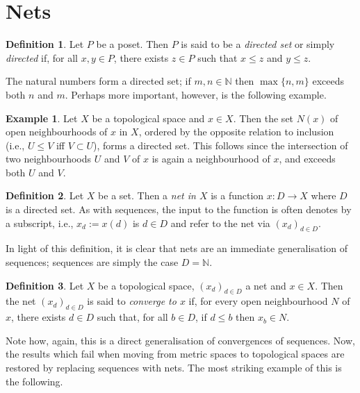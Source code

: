 \documentclass{book}
\theoremstyle{definition}
\newtheorem{definition}{Definition}[section]
\newtheorem{example}{Example}[section]
\theoremstyle{remark}
\newcommand{\N}{\mathbb{N}}
\begin{document}
\section{Nets}
\begin{definition}
Let $P$ be a poset. Then $P$ is said to be a \textit{directed set} or simply \textit{directed} if, for all $x,y\in P$, there exists $z\in P$ such that $x\leq z$ and $y\leq z$.
\end{definition}

The natural numbers form a directed set; if $m,n\in\N$ then $\max\{n,m\}$ exceeds both $n$ and $m$. Perhaps more important, however, is the following example.

\begin{example}
Let $X$ be a topological space and $x\in X$. Then the set $N(x)$ of open neighbourhoods of $x$ in $X$, ordered by the opposite relation to inclusion (i.e., $U\leq V$ iff $V\subset U$), forms a directed set. This follows since the intersection of two neighbourhoods $U$ and $V$ of $x$ is again a neighbourhood of $x$, and exceeds both $U$ and $V$.
\end{example}

\begin{definition}
Let $X$ be a set. Then a \textit{net in $X$} is a function $x:D\to X$ where $D$ is a directed set. As with sequences, the input to the function is often denotes by a subscript, i.e., $x_{d}:=x(d)$ is $d\in D$ and refer to the net via $(x_d)_{d\in D}$.
\end{definition}

In light of this definition, it is clear that nets are an immediate generalisation of sequences; sequences are simply the case $D=\N$.

\begin{definition}
Let $X$ be a topological space, $(x_d)_{d\in D}$ a net and $x\in X$. Then the net $(x_d)_{d\in D}$ is said to \textit{converge to $x$} if, for every open neighbourhood $N$ of $x$, there exists $d\in D$ such that, for all $b\in D$, if $d\leq b$ then $x_b\in N$.
\end{definition}

Note how, again, this is a direct generalisation of convergences of sequences. Now, the results which fail when moving from metric spaces to topological spaces are restored by replacing sequences with nets. The most striking example of this is the following.
\end{document}
